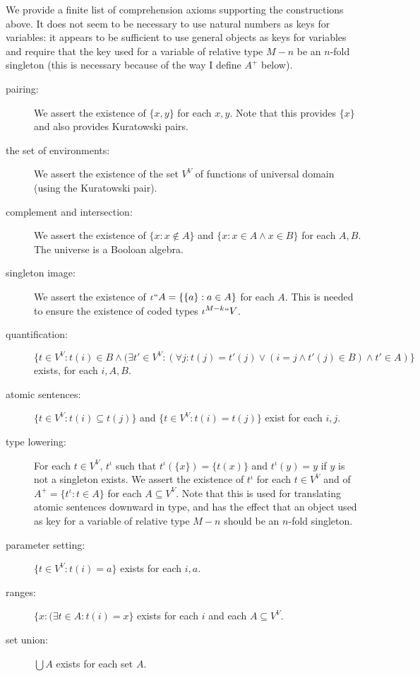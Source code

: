 \documentclass[12pt]{article}
\begin{document}
We provide a finite list of comprehension axioms supporting the constructions above.  It does not seem to be necessary to use natural numbers as keys for variables:  it appears to be sufficient to use general objects as keys for variables and require
that the key used for a variable of relative type $M-n$ be an $n$-fold singleton (this is necessary because of the way I define $A^{+}$ below).

\begin{description}

\item[pairing:]  We assert the existence of $\{x,y\}$ for each $x,y$.  Note that this provides $\{x\}$ and also provides Kuratowski pairs.

\item[the set of environments:]  We assert the existence of the set $V^{V}$ of functions of universal domain (using the Kuratowski pair).

\item[complement and intersection:]  We assert the existence of $\{x : x \not\in A\}$ and $\{x:x \in A \wedge x \in B\}$ for each $A,B$.  The universe is a Booloan algebra.

\item[singleton image:]  We assert the existence of $\iota``A = \{\{a\}:a \in A\}$ for each $A$.  This is needed to ensure the existence of coded types $\iota^{M-k}``V$.

 \item[quantification:]   $$\{t\in V^V:t(i) \in B \wedge (\exists t'\in V^V :(\forall j :t(j) = t'(j) \vee (i=j \wedge t'(j) \in B) \wedge t' \in A)\}$$ exists, for each  $i,A,B$.

\item [atomic sentences:]  $\{t\in V^V:t(i) \subseteq t(j)\}$ and $\{t\in V^V:t(i) = t(j)\}$ exist for each $i,j$.

\item[type lowering:]  For each $t \in V^V$, $t^{\iota}$ such that $t^{\iota}(\{x\}) = \{t(x)\}$ and $t^{\iota}(y) = y$ if $y$ is not a singleton exists.  We assert the existence of $t^{\iota}$ for each $t \in V^V$
and of $A^+ = \{t^{\iota}:t \in A\}$ for each $A \subseteq V^V$.  Note that this is used for translating atomic sentences downward  in type, and has the effect that an object used as key for a variable of relative type $M-n$ should be an $n$-fold singleton.

\item[parameter setting:]  $\{t \in V^V:t(i)=a\}$ exists for each $i,a$.

\item[ranges:]  $\{x:(\exists t \in A:t(i)=x\}$ exists for each $i$ and each $A \subseteq V^V$.

\item[set union:]  $\bigcup A$ exists for each set $A$.

\end{description}
\end{document}
